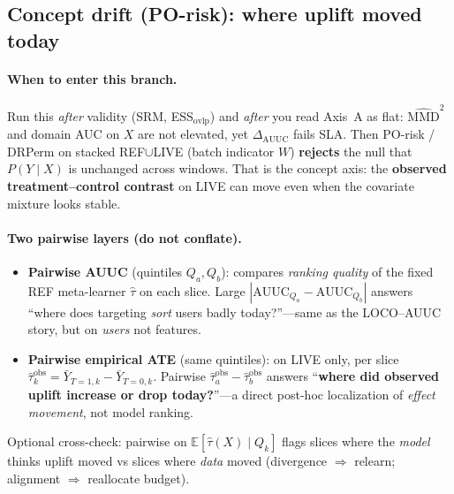 \subsection{Concept drift (PO-risk): where uplift moved today}

\paragraph{When to enter this branch.}
Run this \emph{after} validity (SRM, ESS$_{\mathrm{ovlp}}$) and \emph{after} you read Axis~A as flat: $\widehat{\mathrm{MMD}}^2$ and domain AUC on $X$ are not elevated, yet $\Delta_{\mathrm{AUUC}}$ fails SLA.
Then PO-risk / DRPerm on stacked REF$\cup$LIVE (batch indicator $W$) \textbf{rejects} the null that $P(Y\mid X)$ is unchanged across windows.
That is the concept axis: the \textbf{observed treatment--control contrast} on LIVE can move even when the covariate mixture looks stable.

\paragraph{Two pairwise layers (do not conflate).}
\begin{itemize}
  \item \textbf{Pairwise AUUC} (quintiles $Q_a,Q_b$): compares \emph{ranking quality} of the fixed REF meta-learner $\hat\tau$ on each slice.
  Large $|\mathrm{AUUC}_{Q_a}-\mathrm{AUUC}_{Q_b}|$ answers ``where does targeting \emph{sort} users badly today?''---same as the LOCO--AUUC story, but on \emph{users} not features.
  \item \textbf{Pairwise empirical ATE} (same quintiles): on LIVE only, per slice
  $\widehat{\tau}^{\mathrm{obs}}_k = \bar Y_{T=1,k}-\bar Y_{T=0,k}$.
  Pairwise $\widehat{\tau}^{\mathrm{obs}}_a-\widehat{\tau}^{\mathrm{obs}}_b$ answers ``\textbf{where did observed uplift increase or drop today?}''---a direct post-hoc localization of \emph{effect movement}, not model ranking.
\end{itemize}
Optional cross-check: pairwise on $\mathbb E[\hat\tau(X)\mid Q_k]$ flags slices where the \emph{model} thinks uplift moved vs slices where \emph{data} moved (divergence $\Rightarrow$ relearn; alignment $\Rightarrow$ reallocate budget).

